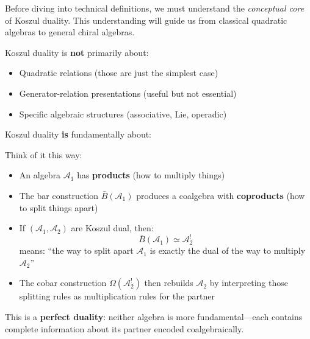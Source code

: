 Before diving into technical definitions, we must understand the \emph{conceptual core} 
of Koszul duality. This understanding will guide us from classical quadratic algebras 
to general chiral algebras.

\begin{principle}
\label{princ:koszul-central-insight}
Koszul duality is \textbf{not} primarily about:
\begin{itemize}
\item Quadratic relations (those are just the simplest case)
\item Generator-relation presentations (useful but not essential)
\item Specific algebraic structures (associative, Lie, operadic)
\end{itemize}

Koszul duality \textbf{is} fundamentally about:
\begin{center}
\end{center}
\end{principle}

\begin{remark}
Think of it this way:
\begin{itemize}
\item An algebra $\mathcal{A}_1$ has \textbf{products} (how to multiply things)
\item The bar construction $\bar{B}(\mathcal{A}_1)$ produces a coalgebra with 
      \textbf{coproducts} (how to split things apart)
\item If $(\mathcal{A}_1, \mathcal{A}_2)$ are Koszul dual, then:
      $$\bar{B}(\mathcal{A}_1) \simeq \mathcal{A}_2^!$$
      means: ``the way to split apart $\mathcal{A}_1$ is exactly the dual of 
      the way to multiply $\mathcal{A}_2$''
\item The cobar construction $\Omega(\mathcal{A}_2^!)$ then rebuilds $\mathcal{A}_2$ 
      by interpreting those splitting rules as multiplication rules for the partner
\end{itemize}

This is a \textbf{perfect duality}: neither algebra is more fundamental—each contains 
complete information about its partner encoded coalgebraically.
\end{remark}

